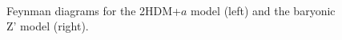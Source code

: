 {\begin{figure}
\centering
 \hspace{1cm}
  \\
\caption{Feynman diagrams for the 2HDM+$a$ model (left) and the baryonic Z' model (right).}
\label{feyns}
\end{figure}





}

